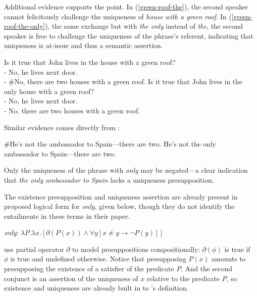 Additional evidence supports the point. In (\ref{green-roof-the}), the second speaker cannot felicitously challenge the uniqueness of \textit{house with a green roof}. In (\ref{green-roof-the-only}), the same exchange but with \textit{the only} instead of \textit{the}, the second speaker is free to challenge the uniqueness of the phrase's referent, indicating that uniqueness is at-issue and thus a semantic assertion.

\begin{exe}
	\ex \label{green-roof-the} Is it true that John lives in the house with a green roof? \\
	    - No, he lives next door. \\
	    - \#No, there are two houses with a green roof.
	\ex \label{green-roof-the-only} Is it true that John lives in the only house with a green roof? \\
	    - No, he lives next door. \\
	    - No, there are two houses with a green roof.
\end{exe}

Similar evidence comes directly from \citet{cb2015}:

\begin{exe}
	\ex \#He's not the ambassador to Spain---there are two.
	\ex He's not the only ambassador to Spain---there are two.
\end{exe}

Only the uniqueness of the phrase with \textit{only} may be negated---a clear indication that \textit{the only ambassador to Spain} lacks a uniqueness presupposition.

The existence presupposition and uniqueness assertion are already present in  proposed logical form for \textit{only}, given below, though they do not identify the entailments in these terms in their paper.

\begin{exe}
	\ex \label{only-lf} \textit{only}: $ \lambda P . \lambda x . [ \partial(P(x)) \land \forall y [ x \ne y \to \neg P(y) ] ] $
\end{exe}

\citeauthor{cb2015} use  partial operator $\partial$ to model presuppositions compositionally: $\partial(\phi)$ is true if $\phi$ is true and undefined otherwise. Notice that presupposing $P(x)$ amounts to presupposing the existence of a satisfier of the predicate $P$. And the second conjunct is an assertion of the uniqueness of $x$ relative to the predicate $P$, so existence and uniqueness are already built in to \citeauthor{cb2015}'s definition.

